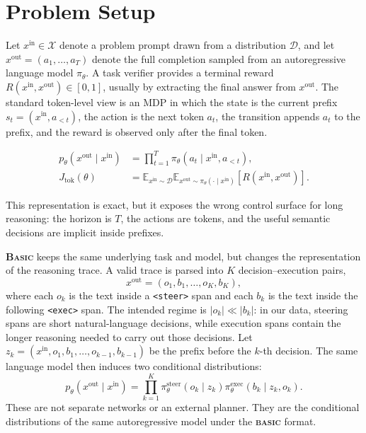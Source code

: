 \documentclass[10pt,twocolumn]{article}
\newcommand{\methodnamestart}{\textbf{\textsf{\textsc{Basic}}}}
\newcommand{\methodname}{\textbf{\textsf{\textsc{basic}}}}
\newcommand{\methodnamestart}{{\sffamily\bfseries B{\fontsize{0.9em}{0.9em}\selectfont ASIC}}}
\newcommand{\methodname}{{\sffamily\bfseries{\fontsize{0.95em}{0.95em}\selectfont BASIC}}}
\begin{document}
\section{Problem Setup}
\label{sec:problem-setup}

Let \(x^{\mathrm{in}} \in \mathcal{X}\) denote a
problem prompt drawn from a
distribution
\(\mathcal{D}\), and let
\(x^{\mathrm{out}} =
(a_1,\ldots,a_T)\)
denote the full completion sampled from an
autoregressive language model \(\pi_\theta\). A task verifier provides a
terminal reward \(R(x^{\mathrm{in}},x^{\mathrm{out}})
\in [0,1]\), usually by extracting the final
answer
from \(x^{\mathrm{out}}\). The standard token-level view is an MDP in
which the state is the
current prefix \(s_t =
(x^{\mathrm{in}},a_{<t})\), the action
is the next token
\(a_t\), the transition appends \(a_t\) to the
prefix, and the reward is
observed only after the final token.

\begin{equation}
  \begin{aligned}
    p_\theta(x^{\mathrm{out}} \mid x^{\mathrm{in}})
     & =
    \prod_{t=1}^{T} \pi_\theta(a_t \mid x^{\mathrm{in}},a_{<t}), \\
    J_{\mathrm{tok}}(\theta)
     & =
    \mathbb{E}_{x^{\mathrm{in}} \sim \mathcal{D}}
    \mathbb{E}_{x^{\mathrm{out}} \sim \pi_\theta(\cdot \mid x^{\mathrm{in}})}
    [R(x^{\mathrm{in}},x^{\mathrm{out}})].
  \end{aligned}
  \label{eq:token-mdp}
\end{equation}

This representation is exact, but it exposes the wrong control surface for
long reasoning: the horizon is \(T\), the actions are tokens, and the useful
semantic decisions are implicit inside prefixes.

\methodnamestart{} keeps the same underlying task and model, but changes the
representation of the reasoning trace. A valid trace is parsed into
\(K\) decision--execution pairs,
\begin{equation}
  x^{\mathrm{out}} =
  (o_1,b_1,\ldots,o_K,b_K),
  \label{eq:basic-trace}
\end{equation}
where each \(o_k\) is the text inside a \texttt{<steer>} span and each
\(b_k\) is the text inside the following \texttt{<exec>} span. The intended
regime is \(|o_k| \ll |b_k|\): in our data, steering spans are short
natural-language decisions, while execution spans contain the longer reasoning
needed to carry out those decisions. Let
\(z_k = (x^{\mathrm{in}},o_1,b_1,\ldots,o_{k-1},b_{k-1})\) be the
prefix before the
\(k\)-th decision. The same language model then induces two conditional
distributions:
\begin{equation}
  p_\theta(x^{\mathrm{out}} \mid x^{\mathrm{in}})
  =
  \prod_{k=1}^{K}
  \pi_\theta^{\mathrm{steer}}(o_k \mid z_k)
  \pi_\theta^{\mathrm{exec}}(b_k \mid z_k,o_k).
  \label{eq:basic-factorization}
\end{equation}
These are not separate networks or an external planner. They are the
conditional distributions of the same autoregressive model under the
\methodname{} format.
\end{document}
